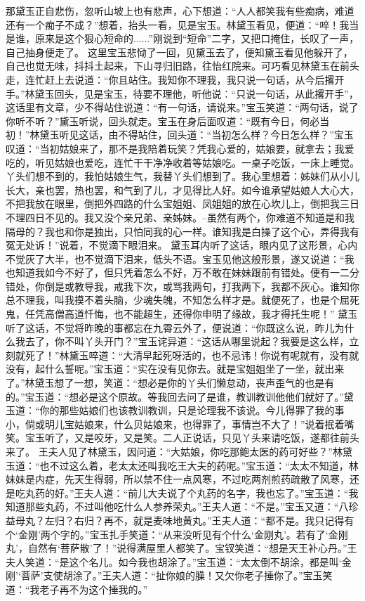 \documentclass[12pt,oneside]{book}
\begin{document}
那黛玉正自悲伤，忽听山坡上也有悲声，心下想道：“人人都笑我有些痴病，难道还有一个痴子不成？”想着，抬头一看，见是宝玉。林黛玉看见，便道：“啐！我当是谁，原来是这个狠心短命的......”刚说到“短命”二字，又把口掩住，长叹了一声，自己抽身便走了。
这里宝玉悲恸了一回，见黛玉去了，便知黛玉看见他躲开了，自己也觉无味，抖抖土起来，下山寻归旧路，往怡红院来。可巧看见林黛玉在前头走，连忙赶上去说道：“你且站住。我知你不理我，我只说一句话，从今后撂开手。”林黛玉回头，见是宝玉，待要不理他，听他说︰“只说一句话，从此撂开手”，这话里有文章，少不得站住说道：“有一句话，请说来。”宝玉笑道：“两句话，说了你听不听？”黛玉听说，回头就走。宝玉在身后面叹道：“既有今日，何必当初！”林黛玉听见这话，由不得站住，回头道：“当初怎么样？今日怎么样？”宝玉叹道：“当初姑娘来了，那不是我陪着玩笑？凭我心爱的，姑娘要，就拿去；我爱吃的，听见姑娘也爱吃，连忙干干净净收着等姑娘吃。一桌子吃饭，一床上睡觉。丫头们想不到的，我怕姑娘生气，我替丫头们想到了。我心里想着：姊妹们从小儿长大，亲也罢，热也罢，和气到了儿，才见得比人好。如今谁承望姑娘人大心大，不把我放在眼里，倒把外四路的什么宝姐姐、凤姐姐的放在心坎儿上，倒把我三日不理四日不见的。我又没个亲兄弟、亲姊妹。--虽然有两个，你难道不知道是和我隔母的？我也和你是独出，只怕同我的心一样。谁知我是白操了这个心，弄得我有冤无处诉！”说着，不觉滴下眼泪来。
黛玉耳内听了这话，眼内见了这形景，心内不觉灰了大半，也不觉滴下泪来，低头不语。宝玉见他这般形景，遂又说道：“我也知道我如今不好了，但只凭着怎么不好，万不敢在妹妹跟前有错处。便有一二分错处，你倒是或教导我，戒我下次，或骂我两句，打我两下，我都不灰心。谁知你总不理我，叫我摸不着头脑，少魂失魄，不知怎么样才是。就便死了，也是个屈死鬼，任凭高僧高道忏悔，也不能超生，还得你申明了缘故，我才得托生呢！”
黛玉听了这话，不觉将昨晚的事都忘在九霄云外了，便说道：“你既这么说，昨儿为什么我去了，你不叫丫头开门？”宝玉诧异道：“这话从哪里说起？我要是这么样，立刻就死了！”林黛玉啐道：“大清早起死呀活的，也不忌讳！你说有呢就有，没有就没有，起什么誓呢。”宝玉道：“实在没有见你去。就是宝姐姐坐了一坐，就出来了。”林黛玉想了一想，笑道：“想必是你的丫头们懒怠动，丧声歪气的也是有的。”宝玉道：“想必是这个原故。等我回去问了是谁，教训教训他他们就好了。”黛玉道：“你的那些姑娘们也该教训教训，只是论理我不该说。今儿得罪了我的事小，倘或明儿宝姑娘来，什么贝姑娘来，也得罪了，事情岂不大了！”说着抿着嘴笑。宝玉听了，又是咬牙，又是笑。二人正说话，只见丫头来请吃饭，遂都往前头来了。
王夫人见了林黛玉，因问道：“大姑娘，你吃那鲍太医的药可好些？”林黛玉道：“也不过这么着，老太太还叫我吃王大夫的药呢。”宝玉道：“太太不知道，林妹妹是内症，先天生得弱，所以禁不住一点风寒，不过吃两剂煎药疏散了风寒，还是吃丸药的好。”王夫人道：“前儿大夫说了个丸药的名字，我也忘了。”宝玉道：“我知道那些丸药，不过叫他吃什么人参养荣丸。”王夫人道：“不是。”宝玉又道：“八珍益母丸？左归？右归？再不，就是麦味地黄丸。”王夫人道：“都不是。我只记得有个‘金刚’两个字的。”宝玉扎手笑道：“从来没听见有个什么‘金刚丸’。若有了‘金刚丸’，自然有‘菩萨散’了！”说得满屋里人都笑了。宝钗笑道：“想是天王补心丹。”王夫人笑道：“是这个名儿。如今我也胡涂了。”宝玉道：“太太倒不胡涂，都是叫‘金刚’‘菩萨’支使胡涂了。”王夫人道：“扯你娘的臊！又欠你老子捶你了。”宝玉笑道：“我老子再不为这个捶我的。”
\end{document}
